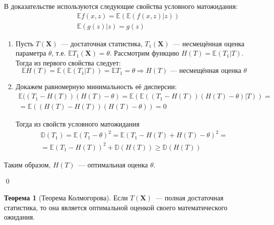 \documentclass[oneside,final,14pt]{extreport}
\renewenvironment{proof}{{\bfseries Доказательство.}}{\qed}
\theoremstyle{plain}
\theoremstyle{definition}
\theoremstyle{named}
\newtheorem*{namedthm}{Теорема}
\begin{document}
\begin{proof}
В доказательстве используются следующие свойства условного матожидания: 
\begin{gather*}
    \mathbb{E} f(x, z)=\mathbb{E}(\mathbb{E}(f(x, z) | z)) \\
    \mathbb{E}(g(z) | z)=g(z)
\end{gather*}

\begin{enumerate}
    \item Пусть $T(\mathbf{X})$~--- достаточная статистика, $T_1(\mathbf{X})$~--- несмещённая оценка параметра $\theta$, т.е. $\mathbb{E} T_{1}(\mathbf{X})=\theta$. Рассмотрим функцию $H(T)=\mathbb{E}\left(T_{1} | T\right)$. Тогда из первого свойства следует:
    \begin{equation*}
        \mathbb{E} H(T)=\mathbb{E}\left(\mathbb{E}\left(T_{1} |     T\right)\right)=\mathbb{E} T_{1}=\theta \Rightarrow H(T)     \text{~--- несмещённая оценка~} \theta
    \end{equation*}

    \item Докажем равномерную минимальность её дисперсии:
    \begin{multline*}
        \mathbb{E}((T_{1}-H(T))(H(T)-\theta)
        = \mathbb{E}(\mathbb{E}((T_{1}-H(T))(H(T)-\theta) | T)) 
        = \\
        = \mathbb{E}((H(T)-H(T))(H(T)-\theta))
        = 0
    \end{multline*}

    Тогда из свойств условного матожидания
    \begin{multline*}
        \mathbb{D}\left(T_{1}\right) 
        = \mathbb{E}\left(T_{1}-\theta\right)^{2}=\mathbb{E}\left(T_{1}-H(T)+H(T)-\theta\right)^{2} =\\
        = \mathbb{E}\left(T_{1}-H(T)\right)^{2}+\mathbb{D}(H(T)) \geqslant \mathbb{D}(H(T))
    \end{multline*}
\end{enumerate}
Таким образом, $H(T)$~--- оптимальная оценка $\theta$.

\end{proof}

\begin{namedthm}[Теорема Колмогорова]
Если $T(\mathbf{X})$~--- полная достаточная статистика, то она является оптимальной оценкой своего математического ожидания.
\end{namedthm}
\end{document}
